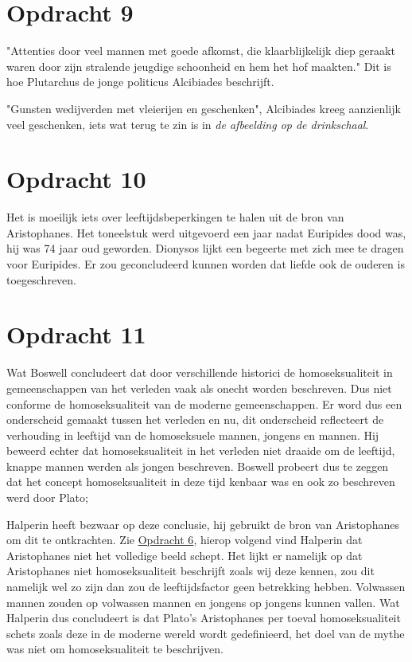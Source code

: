 \documentclass[10pt]{amsart}
\begin{document}
\section*{Opdracht 9}
"Attenties door veel mannen met goede afkomst, die klaarblijkelijk diep geraakt waren door zijn stralende jeugdige schoonheid en hem het hof maakten."\autocite{plutarchusLevenVanAlcibiades120}
Dit is hoe Plutarchus de jonge politicus Alcibiades beschrijft.

"Gunsten wedijverden met vleierijen en geschenken", Alcibiades kreeg aanzienlijk veel geschenken, iets wat terug te zin is in \textit{de afbeelding op de drinkschaal}\autocite{dourisAtticRedFigure}.

\section*{Opdracht 10}
Het is moeilijk iets over leeftijdsbeperkingen te halen uit de bron van Aristophanes\autocite{aristophanesKikkers405}. Het toneelstuk werd uitgevoerd een jaar nadat Euripides dood was, hij was 74 jaar oud geworden. Dionysos lijkt een begeerte met zich mee te dragen voor Euripides. Er zou geconcludeerd kunnen worden dat liefde ook de ouderen is toegeschreven.

\section*{Opdracht 11}
Wat Boswell\autocite{boswellChristianitySocialTolerance1980} concludeert dat door verschillende historici
de homoseksualiteit in gemeenschappen van het verleden vaak als onecht worden beschreven. Dus niet conforme
de homoseksualiteit van de moderne gemeenschappen. Er word dus een onderscheid gemaakt tussen het verleden en
nu, dit onderscheid reflecteert de verhouding in leeftijd van de homoseksuele mannen, jongens en mannen.
Hij beweerd echter dat homoseksualiteit in het verleden niet draaide om de leeftijd, knappe mannen werden
als jongen beschreven. Boswell probeert dus te zeggen dat het concept homoseksualiteit in deze tijd kenbaar was en ook zo beschreven werd door Plato; 

Halperin\autocite{halperinOneHundredYears1990} heeft bezwaar op deze conclusie, hij gebruikt de bron van Aristophanes
om dit te ontkrachten. Zie \hyperref[opdracht6]{Opdracht 6}, hierop volgend vind Halperin dat Aristophanes niet het
volledige beeld schept. Het lijkt er namelijk op dat Aristophanes niet homoseksualiteit beschrijft zoals wij deze
kennen, zou dit namelijk wel zo zijn dan zou de leeftijdsfactor geen betrekking hebben. Volwassen mannen zouden op
volwassen mannen en jongens op jongens kunnen vallen. Wat Halperin dus concludeert is dat Plato's Aristophanes per
toeval homoseksualiteit schets zoals deze in de moderne wereld wordt gedefinieerd, het doel van de mythe was niet om
homoseksualiteit te beschrijven.
\end{document}
